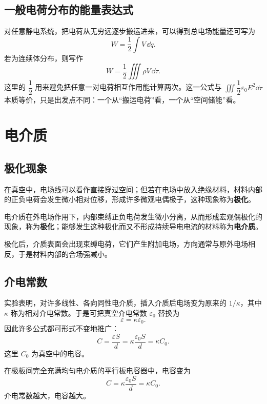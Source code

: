 \subsection{一般电荷分布的能量表达式}

对任意静电系统，把电荷从无穷远逐步搬运进来，可以得到总电场能量还可写为
\[
W=\frac{1}{2}\int V\,\dd q.
\]
若为连续体分布，则写作
\[
W=\frac{1}{2}\iiint \rho V\,\dd \tau.
\]
这里的 $\dfrac{1}{2}$ 用来避免把任意一对电荷相互作用能计算两次。这一公式与 $\iiint \dfrac{1}{2}\varepsilon_0 E^2\dd\tau$ 本质等价，只是出发点不同：一个从“搬运电荷”看，一个从“空间储能”看。

\section{电介质}

\subsection{极化现象}

在真空中，电场线可以看作直接穿过空间；但若在电场中放入绝缘材料，材料内部的正负电荷会发生微小相对位移，形成许多微观电偶极子，这种现象称为\textbf{极化}。

\begin{definition}
电介质在外电场作用下，内部束缚正负电荷发生微小分离，从而形成宏观偶极化的现象，称为\textbf{极化}；能够发生这种极化而又不形成持续导电电流的材料称为\textbf{电介质}。
\end{definition}

极化后，介质表面会出现束缚电荷，它们产生附加电场，方向通常与原外电场相反，于是材料内部的合场强减小。

\subsection{介电常数}

实验表明，对许多线性、各向同性电介质，插入介质后电场变为原来的 $1/\kappa$，其中 $\kappa$ 称为相对介电常数。于是可把真空介电常数 $\varepsilon_0$ 替换为
\[
\varepsilon=\kappa\varepsilon_0.
\]
因此许多公式都可形式不变地推广：
\[
C=\frac{\varepsilon S}{d}=\kappa\frac{\varepsilon_0 S}{d}=\kappa C_0.
\]
这里 $C_0$ 为真空中的电容。

\begin{law}
在极板间完全充满均匀电介质的平行板电容器中，电容变为
\[
C=\kappa \frac{\varepsilon_0 S}{d}=\kappa C_0.
\]
介电常数越大，电容越大。
\end{law}


